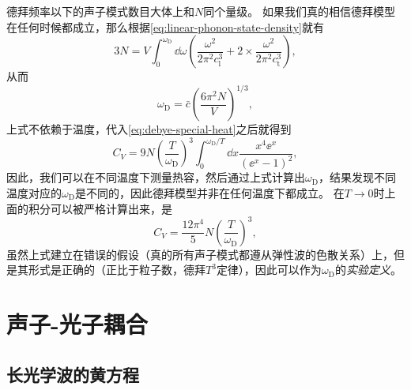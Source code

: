 德拜频率以下的声子模式数目大体上和$N$同个量级。
如果我们真的相信德拜模型在任何时候都成立，那么根据\eqref{eq:linear-phonon-state-density}就有
\[
    3N = V \int_0^{\omega_\text{D}} \dd{\omega} \left( \frac{\omega^2}{2\pi^2 c_\text{l}^3} + 2 \times \frac{\omega^2}{2\pi^2 c_\text{t}^3} \right),
\]
从而
\begin{equation}
    \omega_\text{D} = \bar{c} \left( \frac{6 \pi^2 N}{V} \right)^{1/3}, 
    \label{eq:debye-freq-estimation}
\end{equation}
上式不依赖于温度，代入\eqref{eq:debye-special-heat}之后就得到
\begin{equation}
    C_V = 9 N \left(\frac{T}{\omega_\text{D}}\right)^3 \int_0^{\omega_\text{D} / T} \dd{x} \frac{x^4 \ee^{x}}{(\ee^x - 1)^2} ,
\end{equation}
因此，我们可以在不同温度下测量热容，然后通过上式计算出$\omega_\text{D}$，结果发现不同温度对应的$\omega_\text{D}$是不同的，因此德拜模型并非在任何温度下都成立。
在$T \to 0$时上面的积分可以被严格计算出来，是
\begin{equation}
    C_V = \frac{12 \pi^4}{5} N \left( \frac{T}{\omega_\text{D}} \right)^3,
\end{equation}
虽然上式建立在错误的假设（真的所有声子模式都遵从弹性波的色散关系）上，但是其形式是正确的（正比于粒子数，德拜$T^3$定律），因此可以作为$\omega_\text{D}$的\emph{实验定义}。

\section{声子-光子耦合}

\subsection{长光学波的黄方程}\label{sec:huang-eq}

